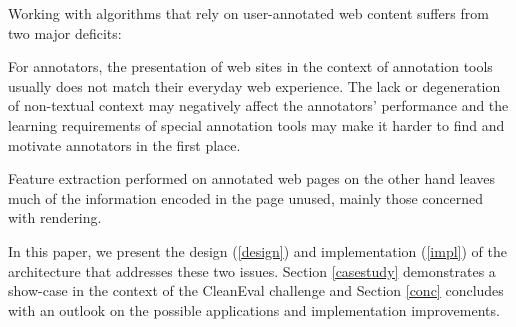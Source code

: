 Working with algorithms that rely on user-annotated web content suffers from two major deficits:

For annotators, the presentation of web sites in the context of annotation tools usually does not match their everyday web experience.
The lack or degeneration of non-textual context may negatively affect the annotators' performance
and the learning requirements of special annotation tools may make it harder to find and motivate annotators in the first place.

Feature extraction performed on annotated web pages on the other hand leaves much of the information encoded in the page unused,
mainly those concerned with rendering.

In this paper, we present the design (\ref{design}) and implementation (\ref{impl}) of the {\KrdWrd} architecture that addresses these two issues.
Section \ref{casestudy} demonstrates a show-case in the context of the CleanEval challenge and Section \ref{conc} concludes with an outlook on the possible applications and implementation improvements.
